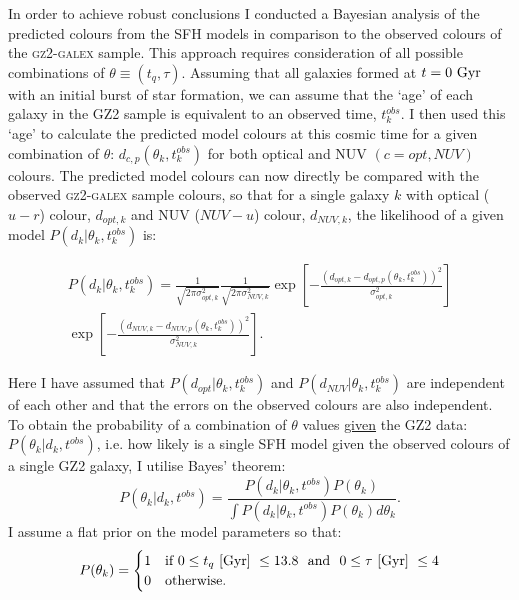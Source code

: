 In order to achieve robust conclusions I conducted a Bayesian analysis \citep{Sivia, mackay03} of the predicted colours from the SFH models in comparison to the observed colours of the \textsc{gz2-galex} sample. This approach requires consideration of all possible combinations of $\theta \equiv (t_{q}, \tau)$. Assuming that all galaxies formed at $t=0~\rm{Gyr}$ with an initial burst of star formation, we can assume that the `age' of each galaxy in the GZ2 sample is equivalent to an observed time, $t^{obs}_{k}$. I then used this  `age' to calculate the predicted model colours at this cosmic time for a given combination of $\theta$: $d_{c,p}(\theta_k, t^{obs}_{k})$ for both optical and NUV $(c={opt,NUV})$ colours. The predicted model colours can now directly be compared with the observed \textsc{gz2-galex} sample colours, so that for a single galaxy $k$ with optical ($u-r$) colour, $d_{opt, k}$ and NUV ($NUV-u$) colour, $d_{NUV,k}$, the likelihood of a given model $P(d_{k}|\theta_k, t^{obs}_{k})$ is:


\begin{equation}\label{like}
\begin{split}
P(d_{k}|\theta_k, t^{obs}_{k}) = \frac{1}{\sqrt{2\pi\sigma_{opt, k}^2}}\frac{1}{\sqrt{2\pi\sigma_{NUV, k}^2}} \exp{\left[ - \frac{(d_{opt, k} - d_{opt, p}(\theta_k, t_{k}^{obs}))^2}{\sigma_{opt, k}^2} \right]} \\ \exp{\left[ - \frac{(d_{NUV, k} - d_{NUV, p}(\theta_k, t_{k}^{obs}))^2}{\sigma_{NUV, k}^2} \right]}.
\end{split}
\end{equation}


Here I have assumed that $P(d_{opt}|\theta_k, t^{obs}_{k})$ and $P(d_{NUV}|\theta_k, t^{obs}_{k})$ are independent of each other and that the errors on the observed colours are also independent. To obtain the probability of a combination of $\theta$ values \underline{given} the GZ2 data: $P(\theta_k|d_k, t^{obs})$, i.e. how likely is a single SFH model given the observed colours of a single GZ2 galaxy, I utilise Bayes' theorem:
 \begin{equation}\label{big}
P(\theta_k|d_k, t^{obs}) = \frac{P(d_k|\theta_k, t^{obs})P(\theta_k)}{\int P(d_k |\theta_k, t^{obs})P(\theta_k) d\theta_k}.
\end{equation}
I assume a flat prior on the model parameters so that:
\begin{equation}\label{prior}
P(\theta_k) =
\begin{cases}
1 & \text{if } 0 \leq t_q ~\rm{[Gyr]}~ \leq 13.8 ~  \text{ and } ~ 0 \leq \tau  ~\rm{[Gyr]}~ \leq 4\\
0 & \text{otherwise.} \\
\end{cases}
\end{equation}

